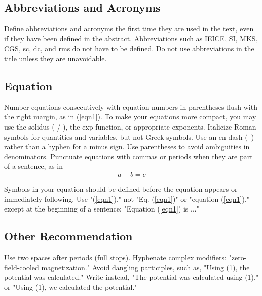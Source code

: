 \documentclass[conference,a4paper]{isap2025}
\begin{document}

\subsection{Abbreviations and Acronyms}

Define abbreviations and acronyms the first time they are used in the text, even if they have been defined in the abstract.  Abbreviations such as IEICE, SI, MKS, CGS, sc, dc, and rms do not have to be defined. Do not use abbreviations in the title unless they are unavoidable.


\subsection{Equation}

Number equations consecutively with equation numbers in parentheses flush with the right margin, as in (\ref{eqn1}). To make your equations more compact, you may use the solidus ( / ), the exp function, or appropriate exponents. Italicize Roman symbols for quantities and variables, but not Greek symbols.  Use an en dash (--) rather than a hyphen for a minus sign.  Use parentheses to avoid ambiguities in denominators. Punctuate equations with commas or periods when they are part of a sentence, as in 
\begin{equation}
a + b = c
\label{eqn1}
\end{equation}

Symbols in your equation should be defined before the equation appears or immediately following. Use "(\ref{eqn1})," not "Eq. (\ref{eqn1})" or "equation (\ref{eqn1})," except at the beginning of a sentence:  "Equation (\ref{eqn1}) is ..."


\subsection{Other Recommendation}

Use two spaces after periods (full stops). Hyphenate complex modifiers: "zero-field-cooled magnetization." Avoid dangling participles, such as, "Using (1), the potential was calculated." Write instead, "The potential was calculated using (1)," or "Using (1), we calculated the potential."
\end{document}
